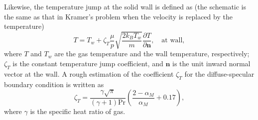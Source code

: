 Likewise, the temperature jump at the solid wall is defined as (the schematic is the same as that in Kramer's problem when the velocity is replaced by the temperature)
\begin{equation}\label{Tjump}
T=T_w+\zeta_T\frac{\mu}{p}\sqrt{\frac{2k_BT_w}{m}}\frac{\partial T}{\partial\bm{n}},\quad \text{at wall},
\end{equation}
where $T$ and $T_w$ are the gas temperature and the wall temperature, respectively; $\zeta_T$ is the constant temperature jump coefficient, and $\bm{n}$ is the unit inward normal vector at the wall.
A rough estimation of the coefficient $\zeta_T$ for the diffuse-specular boundary condition is written as~\cite{Kennard1938,Lin1972}
\begin{equation}\label{estimation2}
\zeta_T=\frac{\gamma\sqrt{\pi}}{\left(\gamma+1\right)\text{Pr}}\left(\frac{2-\alpha_M}{\alpha_M}+0.17\right),
\end{equation}
where $\gamma$ is the specific heat ratio of gas. %



